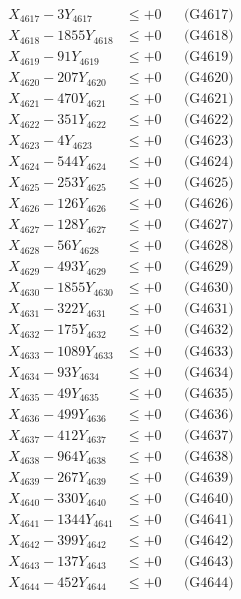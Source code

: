 \documentclass[a4paper,10pt]{article}
\begin{document}
{\begin{align}
X_{4617} - 3Y_{4617} &\leq +0 && \text{(G4617)} \\
X_{4618} - 1855Y_{4618} &\leq +0 && \text{(G4618)} \\
X_{4619} - 91Y_{4619} &\leq +0 && \text{(G4619)} \\
X_{4620} - 207Y_{4620} &\leq +0 && \text{(G4620)} \\
\allowbreak
X_{4621} - 470Y_{4621} &\leq +0 && \text{(G4621)} \\
X_{4622} - 351Y_{4622} &\leq +0 && \text{(G4622)} \\
X_{4623} - 4Y_{4623} &\leq +0 && \text{(G4623)} \\
X_{4624} - 544Y_{4624} &\leq +0 && \text{(G4624)} \\
X_{4625} - 253Y_{4625} &\leq +0 && \text{(G4625)} \\
X_{4626} - 126Y_{4626} &\leq +0 && \text{(G4626)} \\
X_{4627} - 128Y_{4627} &\leq +0 && \text{(G4627)} \\
X_{4628} - 56Y_{4628} &\leq +0 && \text{(G4628)} \\
X_{4629} - 493Y_{4629} &\leq +0 && \text{(G4629)} \\
X_{4630} - 1855Y_{4630} &\leq +0 && \text{(G4630)} \\
\allowbreak
X_{4631} - 322Y_{4631} &\leq +0 && \text{(G4631)} \\
X_{4632} - 175Y_{4632} &\leq +0 && \text{(G4632)} \\
X_{4633} - 1089Y_{4633} &\leq +0 && \text{(G4633)} \\
X_{4634} - 93Y_{4634} &\leq +0 && \text{(G4634)} \\
X_{4635} - 49Y_{4635} &\leq +0 && \text{(G4635)} \\
X_{4636} - 499Y_{4636} &\leq +0 && \text{(G4636)} \\
X_{4637} - 412Y_{4637} &\leq +0 && \text{(G4637)} \\
X_{4638} - 964Y_{4638} &\leq +0 && \text{(G4638)} \\
X_{4639} - 267Y_{4639} &\leq +0 && \text{(G4639)} \\
X_{4640} - 330Y_{4640} &\leq +0 && \text{(G4640)} \\
\allowbreak
X_{4641} - 1344Y_{4641} &\leq +0 && \text{(G4641)} \\
X_{4642} - 399Y_{4642} &\leq +0 && \text{(G4642)} \\
X_{4643} - 137Y_{4643} &\leq +0 && \text{(G4643)} \\
X_{4644} - 452Y_{4644} &\leq +0 && \text{(G4644)} \\

\end{align}}
\end{document}
